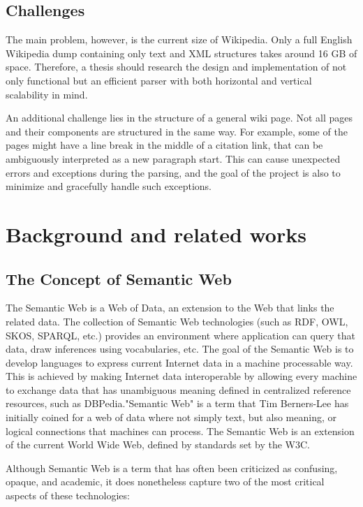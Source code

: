 \documentclass[thesis=M,english,hidelinks]{FITthesis}[2019/12/23]
\begin{document}
\begin{introduction}
  \section{Challenges}
	The main problem, however, is the current size of Wikipedia. Only a full English Wikipedia dump containing only text and XML structures takes around 16 GB of space. Therefore, a thesis should research the design and implementation of not only functional but an efficient parser with both horizontal and vertical scalability in mind.

	An additional challenge lies in the structure of a general wiki page. Not all pages and their components are structured in the same way. For example, some of the pages might have a line break in the middle of a citation link, that can be ambiguously interpreted as a new paragraph start. This can cause unexpected errors and exceptions during the parsing, and the goal of the project is also to minimize and gracefully handle such exceptions.
	
\end{introduction}

\chapter{Background and related works}

\section{The Concept of Semantic Web}

The Semantic Web is a Web of Data, an extension to the Web that links the related data. The collection of Semantic Web technologies (such as \gls{RDF}, \gls{OWL}, \gls{SKOS}, \gls{SPARQL}, etc.) provides an environment where application can query that data, draw inferences using vocabularies, etc. The goal of the Semantic Web is to develop languages to express current Internet data in a machine processable way. This is achieved by making Internet data interoperable  by allowing every machine to exchange data that has unambiguous meaning defined in centralized reference resources, such as DBPedia."Semantic Web" is a term that Tim Berners-Lee has initially coined\cite{Berners_QA} for a web of data where not simply text, but also meaning, or logical connections that machines can process.
The Semantic Web is an extension of the current World Wide Web, defined by standards set by the \gls{W3C}.

Although Semantic Web is a term that has often been criticized as confusing, opaque, and academic, it does nonetheless capture two of the most critical aspects of these technologies:
\end{document}
